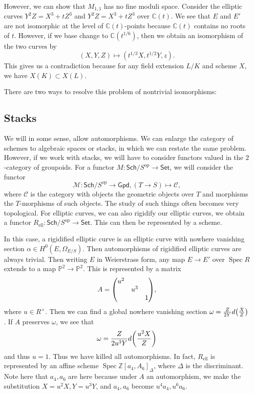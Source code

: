 \documentclass[leqno, openany]{memoir}
\theoremstyle{definition}
\theoremstyle{remark}
\theoremstyle{plain}
\theoremstyle{definition}
\theoremstyle{remark}
\newcommand{\C}{\mathbb{C}}
\newcommand{\Z}{\mathbb{Z}}
\renewcommand{\P}{\mathbb{P}}
\newcommand{\mc}[1]{\mathcal{#1}}
\newcommand{\mr}[1]{\mathrm{#1}}
\newcommand{\ms}[1]{\mathsf{#1}}
\DeclareMathOperator{\Spec}{Spec}
\begin{document}
However, we can show that $M_{1,1}$ has no fine moduli space. Consider the
elliptic curves $Y^2Z = X^3 + tZ^3$ and $Y^2Z = X^3+tZ^3$ over $\C(t)$. We see
that $E$ and $E'$ are not isomorphic at the level of $\C(t)$-points because
$\C(t)$ contains no roots of $t$. However, if we base change to $\C(t^{1/6})$,
then we obtain an isomorphism of the two curves by \[ (X,Y,Z) \mapsto
(t^{1/3}X, t^{1/2}Y, z). \] This gives us a contradiction because for any field
extension $L/K$ and scheme $X$, we have $X(K) \subset X(L)$.

There are two ways to resolve this problem of nontrivial isomorphisms:

\subsection{Stacks}%

    We will in some sense, allow automorphisms. We can enlarge the category of
    schemes to algebraic spaces or stacks, in which we can restate the same
    problem. However, if we work with stacks, we will have to consider functors
    valued in the $2$-category of groupoids. For a functor $M \colon
    \ms{Sch}/S^{\mr{op}} \to \ms{Set}$, we will consider the functor \[ \mc{M}
    \colon \ms{Sch}/S^{\mr{op}} \to \ms{Gpd}, (T \to S ) \mapsto \mc{C}, \]
    where $\mc{C}$ is the category with objects the geometric objects over $T$
    and morphisms the $T$-morphisms of such objects. The study of such things
    often becomes very topological. For elliptic curves, we can also rigidify
    our elliptic curves, we obtain a functor $R_{\mr{ell}} \colon
    \ms{Sch}/S^{\mr{op}} \to \ms{Set}$. This can then be represented by a
    scheme.

        In this case, a rigidified elliptic curve is an elliptic curve with
        nowhere vanishing section $\alpha \in H^0(E, \Omega_{E/S})$. Then
        automorphisms of rigidified elliptic curves are always trivial. Then
        writing $E$ in Weierstrass form, any map $E \to E'$ over $\Spec R$
        extends to a map $\P^2 \to \P^2$. This is represented by a matrix \[ A
        = \mqty(\dmat{u^2, u^3, 1}), \] where $u \in R^{\times}$. Then we can
        find a global nowhere vanishing section $\omega = \frac{Z}{2Y}
        d\qty(\frac{X}{Z})$. If $A$ preserves $\omega$, we see that \[ \omega =
        \frac{Z}{2u^3Y} d\qty(\frac{u^2X}{Z}) \] and thus $u = 1$. Thus we have
        killed all automorphisms. In fact, $R_{\mr{ell}}$ is represented by an
        affine scheme $\Spec \Z[a_4, A_6]_{\Delta}$, where $\Delta$ is the
        discriminant. Note here that $a_4, a_6$ are here because under $A$ an
        automorphism, we make the substitution $X = u^2 X, Y = u^3Y$, and $a_4,
        a_6$ become $u^4 a_4, u^6 a_6$. 
        
\end{document}
